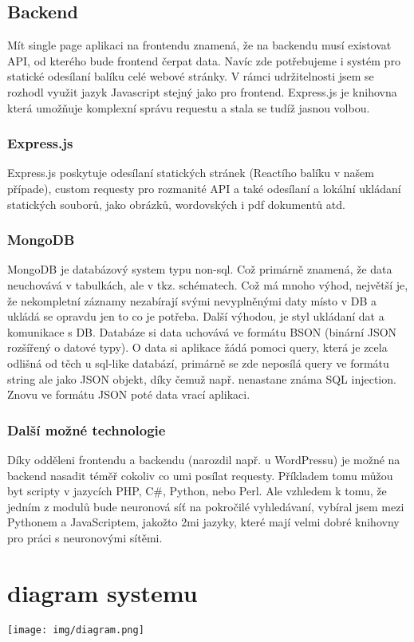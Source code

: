 \subsection{Backend}
Mít single page aplikaci na frontendu znamená, že na backendu musí existovat API,
od kterého bude frontend čerpat data.
Navíc zde potřebujeme i systém pro statické odesílaní balíku celé webové stránky.
V rámci udržitelnosti jsem se rozhodl využit jazyk Javascript stejný jako pro frontend.
Express.js je knihovna která umožňuje komplexní správu requestu a
stala se tudíž jasnou volbou.

\subsubsection{Express.js}
Express.js poskytuje odesílaní statických stránek (Reactího balíku v našem případe),
custom requesty pro rozmanité API a také odesílaní a lokální ukládaní statických souborů,
jako obrázků, wordovských i pdf dokumentů atd.

\subsubsection{MongoDB}
MongoDB je databázový system typu non-sql.
Což primárně znamená, že data neuchovává v tabulkách, ale v tkz. schématech.
Což má mnoho výhod, největší je, že nekompletní záznamy nezabírají
svými nevyplněnými daty místo v DB a ukládá se opravdu jen to co je potřeba.
Další výhodou, je styl ukládaní dat a komunikace s DB.
Databáze si data uchovává ve formátu BSON (binární JSON rozšířený o datové typy).
O data si aplikace žádá pomoci query,
která je zcela odlišná od těch u sql-like databází,
primárně se zde neposílá query ve formátu string ale jako JSON objekt,
díky čemuž např. nenastane známa SQL injection.
Znovu ve formátu JSON poté data vrací aplikaci.

\subsubsection{Další možné technologie}
Díky odděleni frontendu a backendu (narozdil např. u WordPressu) je možné
na backend nasadit téměř cokoliv co umi posílat requesty.
Příkladem tomu můžou byt scripty v jazycích PHP, C\#, Python, nebo Perl.
Ale vzhledem k tomu, že jedním z modulů bude neuronová síť na pokročilé vyhledávaní,
vybíral jsem mezi Pythonem a JavaScriptem, jakožto 2mi jazyky, které
mají velmi dobré knihovny pro práci s neuronovými sítěmi.

\section{diagram systemu}
\texttt{[image: img/diagram.png]}
